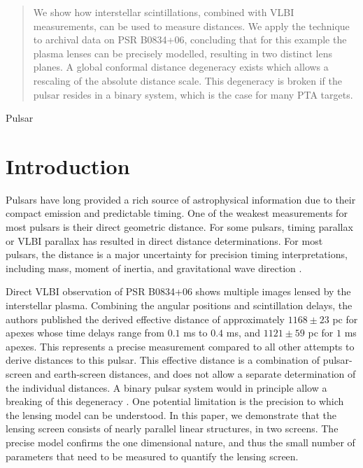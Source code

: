 \documentclass[useAMS,usenatbib]{mn2e}
\begin{document}
\date{\today}

\pagerange{\pageref{firstpage}--\pageref{lastpage}} 

\maketitle
\label{firstpage}
\begin{abstract}
We show how interstellar scintillations, combined with VLBI
measurements, can be used to measure distances.  
We apply the technique to archival data on PSR
B0834+06, concluding that for this example the plasma lenses can be
precisely modelled, resulting in two distinct lens planes.  A global
conformal distance degeneracy exists which allows a rescaling of the
absolute distance scale.  This degeneracy is broken if the pulsar resides in a
binary system, which is the case for many PTA targets.
\end{abstract}
\begin{keywords}
Pulsar
\end{keywords}

\newcommand{\be}{\begin{eqnarray}}
\newcommand{\ee}{\end{eqnarray}}
\newcommand{\beq}{\begin{equation}}
\newcommand{\eeq}{\end{equation}}

\section{Introduction}

Pulsars have long provided a rich source of astrophysical information
due to their compact emission and predictable timing. One of the
weakest measurements for most pulsars is their direct geometric
distance.  For some pulsars, timing parallax or VLBI parallax has
resulted in direct distance determinations.  For most pulsars, the
distance is a major uncertainty for precision timing interpretations,
including mass, moment of inertia, and gravitational wave
direction \citep{boyle2012}.

Direct VLBI observation of PSR B0834+06 shows multiple images lensed
by the interstellar plasma.  Combining the angular positions and
scintillation delays, the authors published the derived effective
distance \citep{2010ApJ...708..232B} of approximately $1168\pm 23$ pc
for apexes whose time delays range from $0.1$ ms to $0.4$ ms, and
$1121\pm 59$ pc for $1$ ms apexes.  This represents a precise
measurement compared to all other attempts to derive distances to this
pulsar.  This effective distance is a combination of pulsar-screen and
earth-screen distances, and does not allow a separate determination of
the individual distances.  A binary pulsar system would in principle
allow a breaking of this degeneracy \citep{2014MNRAS.442.3338P}. One
potential limitation is the precision to which the lensing model can
be understood.  In this paper, we demonstrate that the lensing screen
consists of nearly parallel linear structures, in two screens.  The
precise model confirms the one dimensional nature, and thus the small
number of parameters that need to be measured to quantify the lensing screen. 
\end{document}
